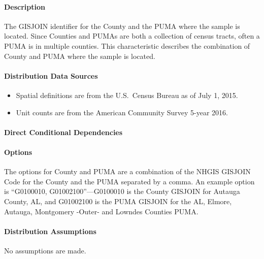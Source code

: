 \paragraph{Description}
% 
The GISJOIN identifier for the County and the PUMA where the sample is located. Since Counties and PUMAs are both a collection of census tracts, often a PUMA is in multiple counties. This characteristic describes the combination of County and PUMA where the sample is located.

\paragraph{Distribution Data Sources}
% 
\begin{itemize}

\item
  Spatial definitions are from the U.S.~Census Bureau as of July 1,
  2015.
\item
  Unit counts are from the American Community Survey 5-year 2016.
\end{itemize}

\paragraph{Direct Conditional Dependencies}


\paragraph{Options}
The options for County and PUMA are a combination of the NHGIS GISJOIN Code for the County and the PUMA separated by a comma. An example option is ``G0100010, G01002100''---G0100010 is the County GISJOIN for Autauga County, AL, and G01002100 is the PUMA GISJOIN for the AL, Elmore, Autauga, Montgomery -Outer- and Lowndes Counties PUMA.

\paragraph{Distribution Assumptions}
% 
No assumptions are made.
